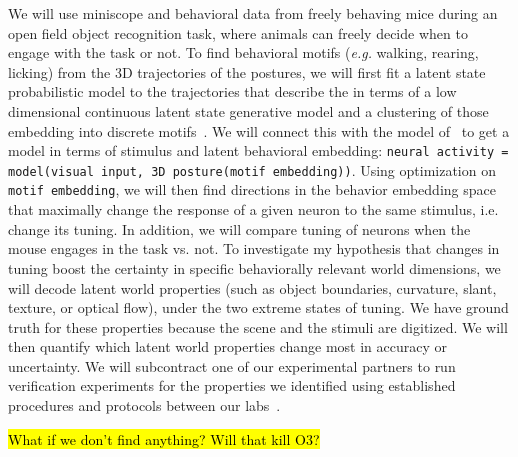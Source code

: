 \documentclass[COG,11pt]{ercgrant}
\begin{document}
We will use miniscope and behavioral data from freely behaving mice during an open field object recognition task, where animals can freely decide when to engage with the task or not.
To find behavioral motifs (\textit{e.g. }walking, rearing, licking) from the 3D trajectories of the postures, we will first fit a latent state probabilistic model to the trajectories that describe the in terms of a low dimensional continuous latent state generative model and a clustering of those embedding into discrete motifs~\parencite{Wiltschko2015-ey, Wiltschko2020-zd}.
We will connect this with the model of~ to get a model in terms of stimulus and latent behavioral embedding: \texttt{neural activity = model(visual input, 3D posture(motif embedding))}.
Using optimization on \texttt{motif embedding}, we will then find directions in the behavior embedding space that maximally change the response of a given neuron to the same stimulus, i.e. change its tuning.
In addition, we will compare tuning of neurons when the mouse engages in the task vs. not.
To investigate my hypothesis that changes in tuning boost the certainty in specific behaviorally relevant world dimensions, we will decode latent world properties (such as object boundaries, curvature, slant, texture, or optical flow), under the two extreme states of tuning. 
We have ground truth for these properties because the scene and the stimuli are digitized.
We will then quantify which latent world properties change most in accuracy or uncertainty.
We will subcontract one of our experimental partners to run verification experiments for the properties we identified using established procedures and protocols between our labs~\parencite[used in \textit{e.g.}][]{Walker2019-yw, Franke2022-do}.

 \hl{What if we don't find anything? Will that kill O3?}
\end{document}
